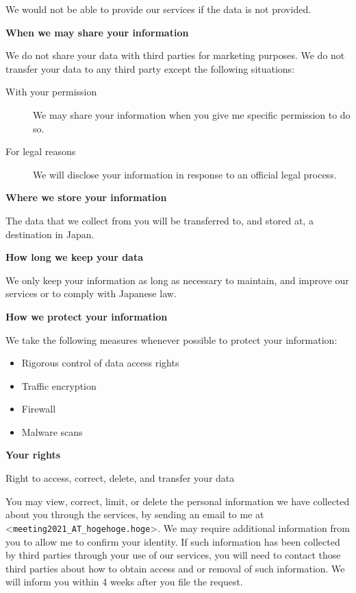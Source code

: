 \documentclass[titlepage,10pt,a4paper,uplatex]{jsbook}
\newenvironment{content}{\begin{shaded}\vspace{-1em}\raggedright\ttfamily\footnotesize\setlength{\baselineskip}{1.4em}}{\end{shaded}\vspace{-1em}}
\renewcommand{\textbf}[1]{{\bfseries\sffamily#1}}
\begin{document}
\begin{content}
We would not be able to provide our services if the data is not provided.

\textbf{\Large When we may share your information}

We do not share your data with third parties for marketing purposes. We do not transfer your data to any third party except the following situations:

\begin{description}
\item[With your permission] We may share your information when you give me specific permission to do so.
\item[For legal reasons] We will disclose your information in response to an official legal process.
\end{description}

\textbf{\Large Where we store your information}

The data that we collect from you will be transferred to, and stored at, a destination in Japan.

\textbf{\Large How long we keep your data}

We only keep your information as long as necessary to maintain, and improve our services or to comply with Japanese law.

\textbf{\Large How we protect your information}

We take the following measures whenever possible to protect your information:

\begin{itemize}
\item Rigorous control of data access rights
\item Traffic encryption
\item Firewall
\item Malware scans
\end{itemize}

\textbf{\Large Your rights}

{\Large Right to access, correct, delete, and transfer your data}

You may view, correct, limit, or delete the personal information we have collected about you through the services, by sending an email to me at {\textless}\texttt{meeting2021\_AT\_hogehoge.hoge}{\textgreater}. We may require additional information from you to allow me to confirm your identity. If such information has been collected by third parties through your use of our services, you will need to contact those third parties about how to obtain access and or removal of such information. We will inform you within 4 weeks after you file the request.


\end{content}
\end{document}
